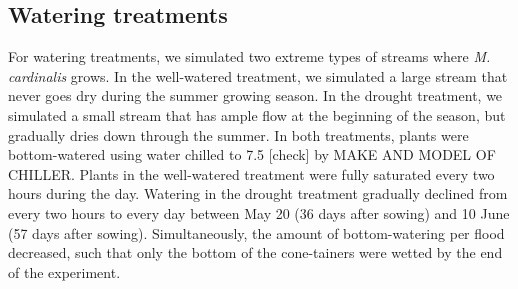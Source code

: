 \documentclass[11pt, oneside]{article}
\begin{document}
\subsection*{Watering treatments}

For watering treatments, we simulated two extreme types of streams where \textit{M. cardinalis} grows. In the well-watered treatment, we simulated a large stream that never goes dry during the summer growing season. In the drought treatment, we simulated a small stream that has ample flow at the beginning of the season, but gradually dries down through the summer. In both treatments, plants were bottom-watered using  water chilled to 7.5 [check] by MAKE AND MODEL OF CHILLER. Plants in the well-watered treatment were fully saturated every two hours during the day. Watering in the drought treatment gradually declined from every two hours to every day between May 20 (36 days after sowing) and 10 June (57 days after sowing). Simultaneously, the amount of bottom-watering per flood decreased, such that only the bottom of the cone-tainers were wetted by the end of the experiment.
\end{document}

